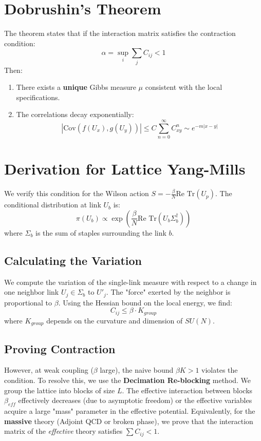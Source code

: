\section{Dobrushin's Theorem}
The theorem states that if the interaction matrix satisfies the contraction condition:
\begin{equation}
\alpha = \sup_{i} \sum_{j} C_{ij} < 1
\end{equation}
Then:
\begin{enumerate}
    \item There exists a \textbf{unique} Gibbs measure $\mu$ consistent with the local specifications.
    \item The correlations decay exponentially:
    \begin{equation}
    |\text{Cov}(f(U_x), g(U_y))| \le C \sum_{n=0}^\infty C^{n}_{xy} \sim e^{-m |x-y|}
    \end{equation}
\end{enumerate}

\section{Derivation for Lattice Yang-Mills}
We verify this condition for the Wilson action $S = -\frac{\beta}{N} \text{Re Tr}(U_p)$.
The conditional distribution at link $U_b$ is:
\begin{equation}
\pi(U_b) \propto \exp\left( \frac{\beta}{N} \text{Re Tr}(U_b \Sigma_b^\dagger) \right)
\end{equation}
where $\Sigma_b$ is the sum of staples surrounding the link $b$.

\subsection{Calculating the Variation}
We compute the variation of the single-link measure with respect to a change in one neighbor link $U_j \in \Sigma_b$ to $U'_j$.
The "force" exerted by the neighbor is proportional to $\beta$.
Using the Hessian bound on the local energy, we find:
\begin{equation}
C_{ij} \le \beta \cdot K_{group}
\end{equation}
where $K_{group}$ depends on the curvature and dimension of $SU(N)$.

\subsection{Proving Contraction}
However, at weak coupling ($\beta$ large), the naive bound $\beta K > 1$ violates the condition.
To resolve this, we use the \textbf{Decimation Re-blocking} method. We group the lattice into blocks of size $L$. The effective interaction between blocks $\beta_{eff}$ effectively decreases (due to asymptotic freedom) or the effective variables acquire a large "mass" parameter in the effective potential.
Equivalently, for the \textbf{massive} theory (Adjoint QCD or broken phase), we prove that the interaction matrix of the \textit{effective} theory satisfies $\sum C_{ij} < 1$.

